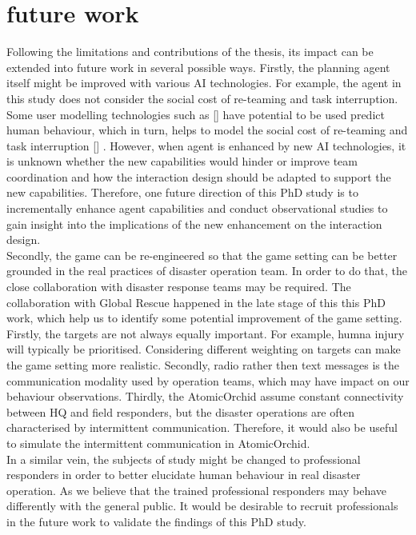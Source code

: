 \section{future work}
Following the limitations and contributions of the thesis, its impact can be extended into future work in several possible ways. Firstly, the planning agent itself might be improved with various AI technologies. For example, the agent in this study does not consider the social cost of re-teaming and task interruption. Some user modelling technologies such as [] have potential to be used predict human behaviour, which in turn, helps to model the social cost of re-teaming and task interruption  [] . However, when agent is enhanced by new AI technologies, it is unknown whether the new capabilities would hinder or improve team coordination and how the interaction design should be adapted to support the new capabilities.  Therefore, one future direction of this PhD study is to incrementally enhance agent capabilities and conduct observational studies to gain insight into the implications of the new enhancement on the interaction design.\\

Secondly, the game can be re-engineered so that the game setting can be better grounded in the real practices of disaster operation team. In order to do that, the close collaboration with disaster response teams may be required. The collaboration with Global Rescue happened  in the late stage of this this PhD work, which help us to identify some potential improvement of the game setting. Firstly, the targets are not always equally important. For example, humna injury will typically be prioritised. Considering different weighting on targets can make the game setting more realistic. Secondly, radio rather then text messages is the communication modality used by operation teams, which may have impact on our behaviour observations. Thirdly, the AtomicOrchid assume constant connectivity between HQ and field responders, but the disaster operations are often characterised by intermittent communication. Therefore, it would also be useful to simulate the intermittent communication in AtomicOrchid.  \\

In a similar vein, the subjects of study might be changed to professional responders in order to better elucidate human behaviour in real disaster operation.  As we believe that the trained professional responders may behave differently with the general public. It would be desirable to recruit professionals in the future work to validate the findings of this PhD study.\\

